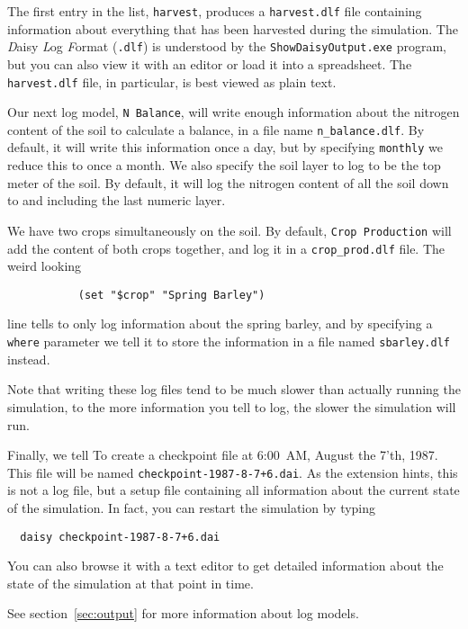 \documentclass[a4paper,11pt]{article}
\begin{document}
The first entry in the list, \texttt{harvest}, produces a
\texttt{harvest.dlf} file containing information about everything that
has been harvested during the simulation.  The \emph{D}aisy \emph{L}og
\emph{F}ormat (\texttt{.dlf}) is understood by the
\texttt{ShowDaisyOutput.exe} program, but you can also view it with an
editor or load it into a spreadsheet.  The \texttt{harvest.dlf} file,
in particular, is best viewed as plain text.

Our next log model, \texttt{N~Balance}, will write enough information
about the nitrogen content of the soil to calculate a balance, in a
file name \texttt{n\_balance.dlf}.  By default, it will write this
information once a day, but by specifying \texttt{monthly} we reduce
this to once a month.  We also specify the soil layer to log to be the
top meter of the soil.  By default, it will log the nitrogen content
of all the soil down to and including the last numeric layer.

We have two crops simultaneously on the soil.  By default,
\texttt{Crop~Production} will add the content of both crops together,
and log it in a \texttt{crop\_prod.dlf} file.  The weird looking

\begin{verbatim}
           (set "$crop" "Spring Barley")
\end{verbatim}%

line tells \daisy{} to only log information about the spring barley,
and by specifying a \texttt{where} parameter we tell it to store the
information in a file named \texttt{sbarley.dlf} instead.

Note that writing these log files tend to be much slower than actually
running the simulation, to the more information you tell \daisy{} to
log, the slower the simulation will run.

Finally, we tell \daisy{} To create a checkpoint file at 6:00~AM,
August the 7'th, 1987.  This file will be named
\texttt{checkpoint-1987-8-7+6.dai}.  As the extension hints, this is
not a log file, but a setup file containing all information about the
current state of the simulation.  In fact, you can restart the
simulation by typing
\begin{verbatim}
  daisy checkpoint-1987-8-7+6.dai
\end{verbatim}
You can also browse it with a text editor to get detailed information
about the state of the simulation at that point in time.

See section~\ref{sec:output} for more information about log models.
\end{document}
